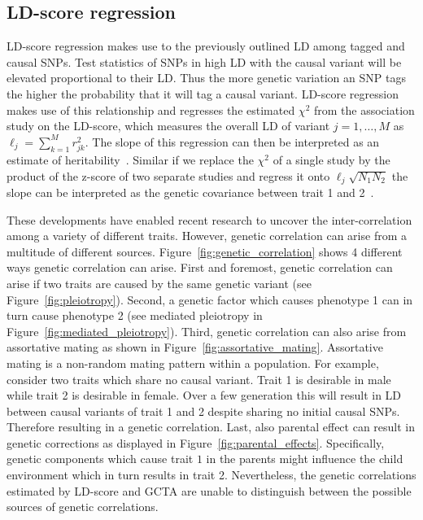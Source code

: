 \subsection{LD-score regression}
\label{sub:ld_score_regression}

LD-score regression makes use to the previously outlined LD among tagged and causal SNPs.
Test statistics of SNPs in high LD with the causal variant will be elevated proportional to their LD\@.
Thus the more genetic variation an SNP tags the higher the probability that it will tag a causal variant.
LD-score regression makes use of this relationship and regresses the estimated $\chi^2$ from the association study on the LD-score, which measures the overall LD of variant $j = 1, \ldots, M$ as $\ell_j = \sum^M_{k=1} r^2_{jk}$. 
The slope of this regression can then be interpreted as an estimate of heritability~\cite{Bulik-Sullivan2015}.
Similar if we replace the $\chi^2$ of a single study by the product of the z-score of two separate studies and regress it onto $\ell_j \sqrt{N_{1}N_{2}}$ the slope can be interpreted as the genetic covariance between trait 1 and 2~\cite{Bulik-Sullivan2015a}.

These developments have enabled recent research to uncover the inter-correlation among a variety of different traits.
However, genetic correlation can arise from a multitude of different sources.
Figure~\ref{fig:genetic_correlation} shows 4 different ways genetic correlation can arise.
First and foremost, genetic correlation can arise if two traits are caused by the same genetic variant (see Figure~\ref{fig:pleiotropy}).
Second, a genetic factor which causes phenotype 1 can in turn cause phenotype 2 (see mediated pleiotropy in Figure~\ref{fig:mediated_pleiotropy}).
Third, genetic correlation can also arise from assortative mating as shown in Figure~\ref{fig:assortative_mating}.
Assortative mating is a non-random mating pattern within a population.
For example, consider two traits which share no causal variant.
Trait 1 is desirable in male while trait 2 is desirable in female.
Over a few generation this will result in LD between causal variants of trait 1 and 2 despite sharing no initial causal SNPs.
Therefore resulting in a genetic correlation. 
Last, also parental effect can result in genetic corrections as displayed in Figure~\ref{fig:parental_effects}.
Specifically, genetic components which cause trait $1$ in the parents might influence the child environment which in turn results in trait 2. 
Nevertheless, the genetic correlations estimated by LD-score and GCTA are unable to distinguish between the possible sources of genetic correlations.

